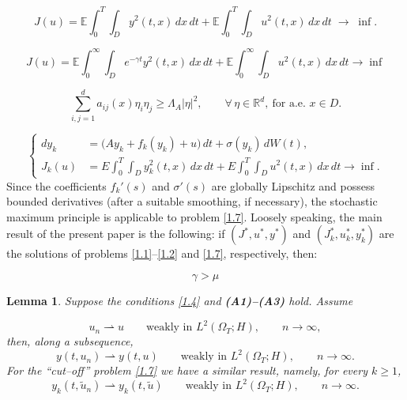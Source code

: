 \documentclass[10pt,a4paper]{amsart}
\newtheorem{lemma}{Lemma}
\def\E{\mathbb{E}}
\newcommand{\R}{{\mathbb R}}
\begin{document}
\begin{equation}\label{1.2}
J(u)
=
\E\int_{0}^{T}\int_{D} y^2(t,x)\,dx\,dt
+
\E\int_{0}^{T}\int_{D} u^2(t,x)\,dx\,dt
\;\to\;
\inf .
\end{equation}

\begin{equation}\label{1.3}
J(u)
=
\E\int_{0}^{\infty}\int_{D} e^{-\gamma t} y^2(t,x)\,dx\,dt
+
\E\int_{0}^{\infty}\int_{D} u^2(t,x)\,dx\,dt
\to \inf 
\end{equation}

\begin{equation}\label{1.4}
\sum_{i,j=1}^{d}
a_{ij}(x)\eta_i\eta_j
\ge
\Lambda_A |\eta|^2,
\qquad
\forall\,\eta\in\mathbb \R^d,
\ \text{for a.e. } x\in D.
\end{equation}

\begin{equation}
\left\{
\begin{aligned}
dy_k
&=
\bigl(Ay_k+f_k(y_k)+u\bigr)\,dt
+\sigma(y_k)\,dW(t),
\\[1ex]
J_k(u)
&=
E\int_0^T\int_D y_k^2(t,x)\,dx\,dt
+
E\int_0^T\int_D u^2(t,x)\,dx\,dt
\to \inf .
\end{aligned}
\right.
\label{1.7}
\end{equation}
 Since the coefficients
$f_k'(s)$ and $\sigma'(s)$ are globally Lipschitz and  possess bounded
derivatives (after a suitable smoothing, if necessary),
 the stochastic maximum principle is applicable to
problem \eqref{1.7}. Loosely speaking, the main result of the present paper is the following: if $
(J^*,u^*,y^*)$ and $
(J_k^*,u_k^*,y_k^*)
$
are the solutions of problems
\eqref{1.1}--\eqref{1.2}
and
\eqref{1.7},
respectively, then:

\begin{equation}\label{2.10}
    \gamma > \mu
\end{equation}

\begin{lemma}\label{lem:3.2}
Suppose the conditions \eqref{1.4} and {{\bf\rm(A1)--(A3)}} hold.
Assume 

\[
 u_n \rightharpoonup u
\qquad\text{weakly in }L^2(\Omega_T;H),
\qquad
n\to\infty,
\]
then, along a subsequence,
\begin{equation} y(t, u_n)
\rightharpoonup
 y(t, u)
\qquad\text{weakly in }
L^2(\Omega_T;H),
\qquad
n\to\infty.
\label{3.1}
\end{equation}
For the ``cut--off'' problem \eqref{1.7} we have a similar result, namely, for every $k \ge 1$,
\begin{equation}
y_k(t, \widetilde u_n)
\rightharpoonup
y_k(t, \widetilde u)
\qquad\text{weakly in }
L^2(\Omega_T;H),
\qquad
n\to\infty.
\label{3.2}
\end{equation}
\end{lemma}
\end{document}
